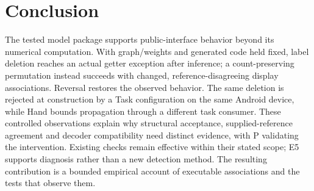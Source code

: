 \documentclass[10pt,twocolumn,letterpaper]{article}
\begin{document}
\section{Conclusion}
The tested model package supports public-interface behavior beyond its numerical computation. With graph/weights and generated code held fixed, label deletion reaches an actual getter exception after inference; a count-preserving permutation instead succeeds with changed, reference-disagreeing display associations. Reversal restores the observed behavior. The same deletion is rejected at construction by a Task configuration on the same Android device, while Hand bounds propagation through a different task consumer. These controlled observations explain why structural acceptance, supplied-reference agreement and decoder compatibility need distinct evidence, with P validating the intervention. Existing checks remain effective within their stated scope; E5 supports diagnosis rather than a new detection method. The resulting contribution is a bounded empirical account of executable associations and the tests that observe them.
\end{document}
